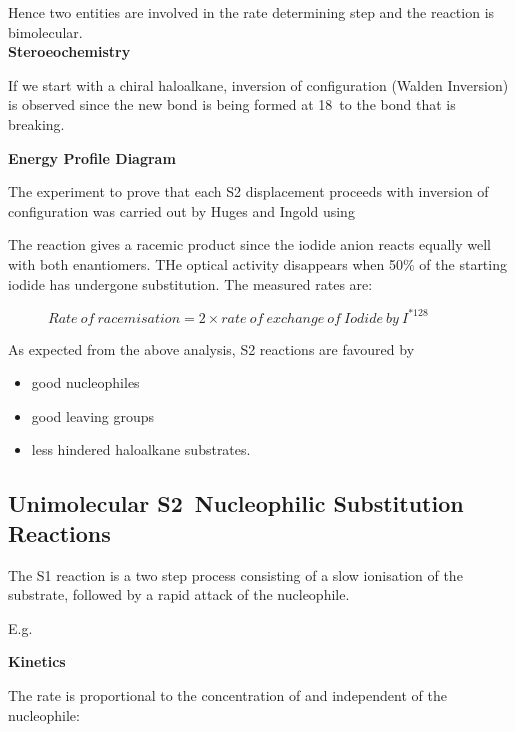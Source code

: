 Hence two entities are involved in the rate determining step and the reaction is
bimolecular.\\

\textbf{Steroeochemistry}

If we start with a chiral haloalkane, inversion of configuration (Walden Inversion)
is observed since the new bond is being formed at 18\de\ to the bond that is breaking.


\textbf{Energy Profile Diagram}


The experiment to prove that each S2 displacement proceeds with inversion
of configuration was carried out by Huges and Ingold using 


The reaction gives a racemic product since the iodide anion  reacts
equally well with both enantiomers. THe optical activity disappears when 50\%
of the starting iodide has undergone substitution. The measured rates are:

\begin{figure}[H]
  \centering
  $Rate\ of\ racemisation = 2 \times rate\ of\ exchange\ of\ Iodide\ by\ I^{*128}$
\end{figure}



As expected from the above analysis, S2 reactions are favoured by
\begin{itemize}
  \item good nucleophiles
  \item good leaving groups
  \item less hindered haloalkane substrates.
\end{itemize}

\subsection{Unimolecular \texorpdfstring{S2}\ \ Nucleophilic Substitution Reactions}

The S1 reaction is a two step process consisting of a slow ionisation
of the substrate, followed by a rapid attack of the nucleophile.


E.g.


\textbf{Kinetics}

The rate is proportional to the concentration of  and independent of
the nucleophile:

